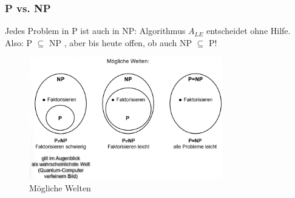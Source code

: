 \documentclass{article}
\begin{document}
            \subsubsection{P vs. NP}
                Jedes Problem in P ist auch in NP: Algorithmus $A_{LE}$ entscheidet ohne Hilfe.\\
                Also: P $\subseteq$ NP , aber bis heute offen, ob auch NP $\subseteq$ P!\\
                \begin{figure}[ht]
                    \centering
                    \includegraphics[width=0.75\textwidth]{Bilder/PvNP.png}
                    \caption{Mögliche Welten}
                    \label{fig:PvNP}
                \end{figure}
\end{document}

